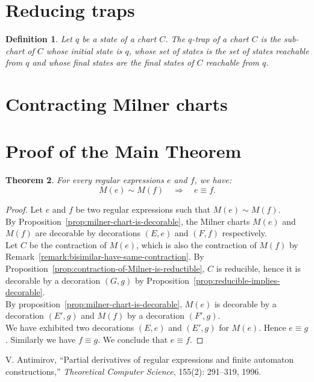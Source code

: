 \documentclass{article}
\newtheorem{definition}{Definition}[section]
\newtheorem{theorem}[definition]{Theorem}
\begin{document}
\section{Reducing traps}

\begin{definition} Let $q$ be a state of a chart $C$.
  The $q$-\emph{trap} of a chart $C$ is the sub-chart of $C$ whose initial state is $q$, whose set of states is the set of states reachable from $q$ and whose final states are the final states of $C$ reachable from $q$.
\end{definition}

\section{Contracting Milner charts}


\section{Proof of the Main Theorem}
\begin{theorem} For every regular expressions $e$ and $f$, we have:
     $$M(e)\sim M(f) \quad \Longrightarrow \quad e \equiv f.$$
\end{theorem}
\begin{proof}
    Let $e$ and $f$ be two regular expressions such that $M(e)\sim M(f)$. \\
    
    By Proposition~\ref{prop:milner-chart-is-decorable}, the Milner charts $M(e)$ and $M(f)$ are decorable by decorations
     $(E,e)$ and $(F,f)$ respectively.\\

    Let $C$ be the contraction of $M(e)$, which is also the contraction of $M(f)$ by Remark~\ref{remark:bisimilar-have-same-contraction}.
    By Proposition~\ref{prop:contraction-of-Milner-is-reductible}, $C$ is reducible, 
    hence it is decorable by a decoration $(G,g)$ by Proposition~\ref{prop:reducible-implies-decorable}.\\


    By proposition~\ref{prop:milner-chart-is-decorable}, $M(e)$ is decorable by a decoration $(E',g)$ and $M(f)$ by a decoration $(F',g)$.\\

    We have exhibited two decorations $(E,e)$ and $(E',g)$ for  $M(e)$. Hence $e\equiv g$. Similarly we have 
    $f\equiv g$. We conclude that $e\equiv f$.
\end{proof}
    \begin{thebibliography}{9}
V. Antimirov, ``Partial derivatives of regular expressions and finite automaton constructions,'' \emph{Theoretical Computer Science}, 155(2): 291--319, 1996.
\end{thebibliography}
\end{document}
